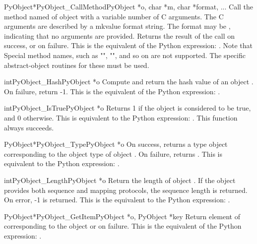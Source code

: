 \begin{cfuncdesc}{PyObject*}{PyObject_CallMethod}{PyObject *o, char *m, char *format, ...}
Call the method named  of object  with a variable number of
C arguments.  The C arguments are described by a mkvalue
format string.  The format may be \NULL{}, indicating that no
arguments are provided. Returns the result of the call on
success, or \NULL{} on failure.  This is the equivalent of the
Python expression: .
Note that Special method names, such as "",
"", and so on are not supported. The specific
abstract-object routines for these must be used.
\end{cfuncdesc}


\begin{cfuncdesc}{int}{PyObject_Hash}{PyObject *o}
Compute and return the hash value of an object .  On
failure, return -1.  This is the equivalent of the Python
expression: .
\end{cfuncdesc}


\begin{cfuncdesc}{int}{PyObject_IsTrue}{PyObject *o}
Returns 1 if the object  is considered to be true, and
0 otherwise. This is equivalent to the Python expression:
.
This function always succeeds.
\end{cfuncdesc}


\begin{cfuncdesc}{PyObject*}{PyObject_Type}{PyObject *o}
On success, returns a type object corresponding to the object
type of object . On failure, returns \NULL{}.  This is
equivalent to the Python expression: .
\end{cfuncdesc}

\begin{cfuncdesc}{int}{PyObject_Length}{PyObject *o}
Return the length of object .  If the object  provides
both sequence and mapping protocols, the sequence length is
returned. On error, -1 is returned.  This is the equivalent
to the Python expression: .
\end{cfuncdesc}


\begin{cfuncdesc}{PyObject*}{PyObject_GetItem}{PyObject *o, PyObject *key}
Return element of  corresponding to the object  or \NULL{}
on failure. This is the equivalent of the Python expression:
.
\end{cfuncdesc}


